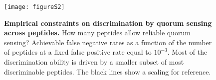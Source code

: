 \documentclass[superscriptaddress,twocolumn,pre]{revtex4}
\newcommand{\<}{\langle}
\renewcommand{\>}{\rangle}
\begin{document}
\begin{figure}
     \texttt{[image: figureS2]}
     \caption{
         {\bf Empirical constraints on discrimination by quorum sensing across peptides.}
        How many peptides allow reliable quorum sensing? Achievable false negative rates as a function of the number of peptides at a fixed false positive rate equal to $10^{-3}$. Most of the discrimination ability is driven by a smaller subset of most discriminable peptides. The black lines show a  scaling for reference.
     \label{figureS2}
     }
\end{figure}




\end{document}

